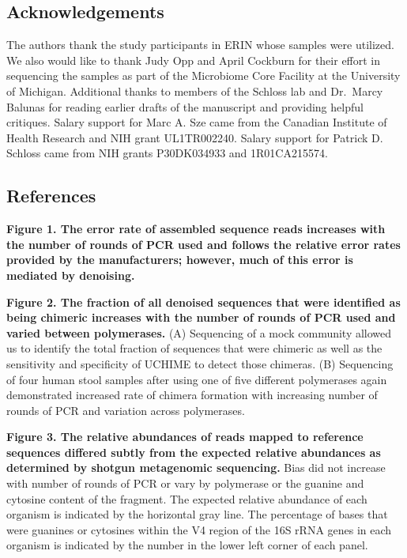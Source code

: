 \documentclass[11,]{article}
\begin{document}
\newpage

\subsection{Acknowledgements}\label{acknowledgements}

The authors thank the study participants in ERIN whose samples were
utilized. We also would like to thank Judy Opp and April Cockburn for
their effort in sequencing the samples as part of the Microbiome Core
Facility at the University of Michigan. Additional thanks to members of
the Schloss lab and Dr.~Marcy Balunas for reading earlier drafts of the
manuscript and providing helpful critiques. Salary support for Marc A.
Sze came from the Canadian Institute of Health Research and NIH grant
UL1TR002240. Salary support for Patrick D. Schloss came from NIH grants
P30DK034933 and 1R01CA215574.

\newpage

\subsection{References}\label{references}

\newpage

\textbf{Figure 1. The error rate of assembled sequence reads increases
with the number of rounds of PCR used and follows the relative error
rates provided by the manufacturers; however, much of this error is
mediated by denoising.}

\textbf{Figure 2. The fraction of all denoised sequences that were
identified as being chimeric increases with the number of rounds of PCR
used and varied between polymerases.} (A) Sequencing of a mock community
allowed us to identify the total fraction of sequences that were
chimeric as well as the sensitivity and specificity of UCHIME to detect
those chimeras. (B) Sequencing of four human stool samples after using
one of five different polymerases again demonstrated increased rate of
chimera formation with increasing number of rounds of PCR and variation
across polymerases.

\textbf{Figure 3. The relative abundances of reads mapped to reference
sequences differed subtly from the expected relative abundances as
determined by shotgun metagenomic sequencing.} Bias did not increase
with number of rounds of PCR or vary by polymerase or the guanine and
cytosine content of the fragment. The expected relative abundance of
each organism is indicated by the horizontal gray line. The percentage
of bases that were guanines or cytosines within the V4 region of the 16S
rRNA genes in each organism is indicated by the number in the lower left
corner of each panel.
\end{document}
